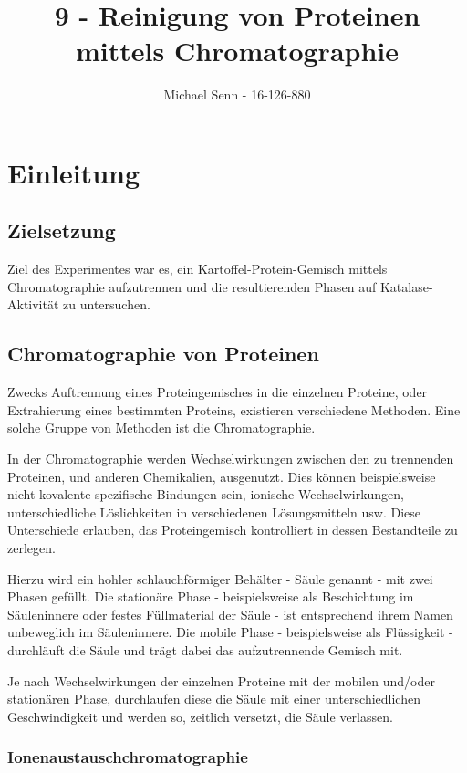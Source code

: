 \documentclass[a4paper,german]{scrreprt}
\title{9 - Reinigung von Proteinen mittels Chromatographie}
\author{Michael Senn \maillink{michael.senn@students.unibe.ch} - 16-126-880}
\date{\printdate}
\begin{document}
\maketitle

\chapter{Einleitung}

\section{Zielsetzung}

Ziel des Experimentes war es, ein Kartoffel-Protein-Gemisch mittels
Chromatographie aufzutrennen und die resultierenden Phasen auf
Katalase-Aktivität zu untersuchen.

\section{Chromatographie von Proteinen}

Zwecks Auftrennung eines Proteingemisches in die einzelnen Proteine, oder
Extrahierung eines bestimmten Proteins, existieren verschiedene Methoden. Eine
solche Gruppe von Methoden ist die Chromatographie.

In der Chromatographie werden Wechselwirkungen zwischen den zu trennenden
Proteinen, und anderen Chemikalien, ausgenutzt. Dies können beispielsweise
nicht-kovalente spezifische Bindungen sein, ionische Wechselwirkungen,
unterschiedliche Löslichkeiten in verschiedenen Lösungsmitteln usw. Diese
Unterschiede erlauben, das Proteingemisch kontrolliert in dessen Bestandteile
zu zerlegen.

Hierzu wird ein hohler schlauchförmiger Behälter - Säule genannt - mit zwei
Phasen gefüllt. Die stationäre Phase - beispielsweise als Beschichtung im
Säuleninnere oder festes Füllmaterial der Säule - ist entsprechend ihrem Namen
unbeweglich im Säuleninnere. Die mobile Phase - beispielsweise als Flüssigkeit
- durchläuft die Säule und trägt dabei das aufzutrennende Gemisch mit.

Je nach Wechselwirkungen der einzelnen Proteine mit der mobilen und/oder
stationären Phase, durchlaufen diese die Säule mit einer unterschiedlichen
Geschwindigkeit und werden so, zeitlich versetzt, die Säule verlassen.

\subsection{Ionenaustauschchromatographie}
\end{document}

